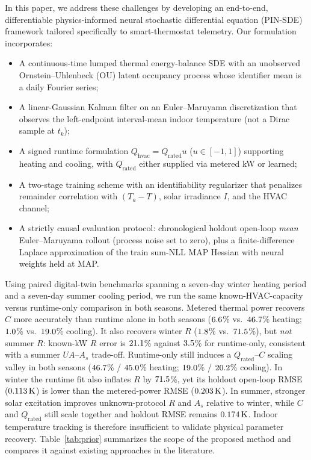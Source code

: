 \documentclass[11pt,letterpaper]{article}
\begin{document}
In this paper, we address these challenges by developing an end-to-end, differentiable physics-informed neural stochastic differential equation (PIN-SDE) framework tailored specifically to smart-thermostat telemetry. Our formulation incorporates:
\begin{itemize}
\item A continuous-time lumped thermal energy-balance SDE with an unobserved Ornstein--Uhlenbeck (OU) latent occupancy process whose identifier mean is a daily Fourier series;
\item A linear-Gaussian Kalman filter on an Euler--Maruyama discretization that observes the left-endpoint interval-mean indoor temperature (not a Dirac sample at $t_k$);
\item A signed runtime formulation $Q_\mathrm{hvac} = Q_\mathrm{rated}u$ ($u \in [-1, 1]$) supporting heating and cooling, with $Q_\mathrm{rated}$ either supplied via metered kW or learned;
\item A two-stage training scheme with an identifiability regularizer that penalizes remainder correlation with $(T_a - T)$, solar irradiance $I$, and the HVAC channel;
\item A strictly causal evaluation protocol: chronological holdout open-loop \emph{mean} Euler--Maruyama rollout (process noise set to zero), plus a finite-difference Laplace approximation of the train sum-NLL MAP Hessian with neural weights held at MAP.
\end{itemize}

Using paired digital-twin benchmarks spanning a seven-day winter heating period and a seven-day summer cooling period, we run the same known-HVAC-capacity versus runtime-only comparison in both seasons. Metered thermal power recovers $C$ more accurately than runtime alone in both seasons ($6.6$\% vs.\ $46.7$\% heating; $1.0$\% vs.\ $19.0$\% cooling). It also recovers winter $R$ ($1.8$\% vs.\ $71.5$\%), but \emph{not} summer $R$: known-kW $R$ error is $21.1$\% against $3.5$\% for runtime-only, consistent with a summer $UA$--$A_s$ trade-off. Runtime-only still induces a $Q_\mathrm{rated}$--$C$ scaling valley in both seasons ($46.7$\% / $45.0$\% heating; $19.0$\% / $20.2$\% cooling). In winter the runtime fit also inflates $R$ by $71.5$\%, yet its holdout open-loop RMSE ($0.113\,\mathrm{K}$) is lower than the metered-power RMSE ($0.203\,\mathrm{K}$). In summer, stronger solar excitation improves unknown-protocol $R$ and $A_s$ relative to winter, while $C$ and $Q_\mathrm{rated}$ still scale together and holdout RMSE remains $0.174\,\mathrm{K}$. Indoor temperature tracking is therefore insufficient to validate physical parameter recovery. Table~\ref{tab:prior} summarizes the scope of the proposed method and compares it against existing approaches in the literature.
\end{document}
